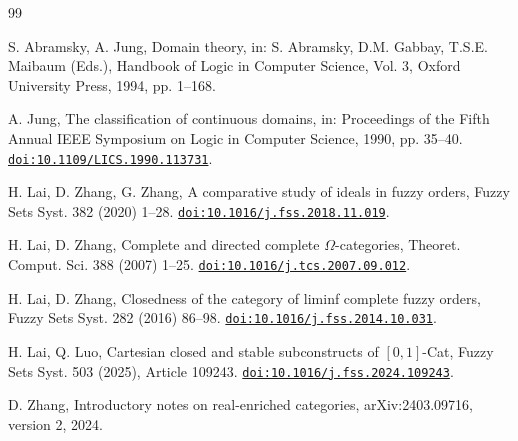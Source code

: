 \documentclass[preprint,3p,times]{elsarticle}
\theoremstyle{definition}
\theoremstyle{remark}
\numberwithin{equation}{section}
\begin{document}
\begingroup
\small
\raggedright
\setlength{\bibsep}{4pt plus 1pt minus 1pt}
\begin{thebibliography}{99}

S. Abramsky, A. Jung,
Domain theory,
in: S. Abramsky, D.M. Gabbay, T.S.E. Maibaum (Eds.),
Handbook of Logic in Computer Science, Vol. 3,
Oxford University Press, 1994, pp. 1--168.

A. Jung,
The classification of continuous domains,
in: Proceedings of the Fifth Annual IEEE Symposium on Logic in Computer Science,
1990, pp. 35--40.
\newblock \href{https://doi.org/10.1109/LICS.1990.113731}{\nolinkurl{doi:10.1109/LICS.1990.113731}}.


H. Lai, D. Zhang, G. Zhang,
A comparative study of ideals in fuzzy orders,
Fuzzy Sets Syst. 382 (2020) 1--28.
\newblock \href{https://doi.org/10.1016/j.fss.2018.11.019}{\nolinkurl{doi:10.1016/j.fss.2018.11.019}}.

H. Lai, D. Zhang,
Complete and directed complete \(\Omega\)-categories,
Theoret. Comput. Sci. 388 (2007) 1--25.
\newblock \href{https://doi.org/10.1016/j.tcs.2007.09.012}{\nolinkurl{doi:10.1016/j.tcs.2007.09.012}}.


H. Lai, D. Zhang,
Closedness of the category of liminf complete fuzzy orders,
Fuzzy Sets Syst. 282 (2016) 86--98.
\newblock \href{https://doi.org/10.1016/j.fss.2014.10.031}{\nolinkurl{doi:10.1016/j.fss.2014.10.031}}.

H. Lai, Q. Luo,
Cartesian closed and stable subconstructs of \([0,1]\)-Cat,
Fuzzy Sets Syst. 503 (2025), Article 109243.
\newblock \href{https://doi.org/10.1016/j.fss.2024.109243}{\nolinkurl{doi:10.1016/j.fss.2024.109243}}.

D. Zhang,
Introductory notes on real-enriched categories,
arXiv:2403.09716, version 2, 2024.


\end{thebibliography}
\end{document}
